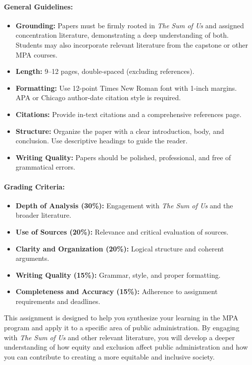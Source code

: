 \documentclass[12pt]{article}     %
\begin{document}
\paragraph*{General Guidelines:}
\begin{itemize}
    \item \textbf{Grounding:} Papers must be firmly rooted in \textit{The Sum of Us} and assigned concentration literature, demonstrating a deep understanding of both. Students may also incorporate relevant literature from the capstone or other MPA courses.  
    \item \textbf{Length:} 9--12 pages, double-spaced (excluding references).  
    \item \textbf{Formatting:} Use 12-point Times New Roman font with 1-inch margins. APA or Chicago author-date citation style is required.  
    \item \textbf{Citations:} Provide in-text citations and a comprehensive references page.  
    \item \textbf{Structure:} Organize the paper with a clear introduction, body, and conclusion. Use descriptive headings to guide the reader.  
    \item \textbf{Writing Quality:} Papers should be polished, professional, and free of grammatical errors.  
\end{itemize}

\paragraph*{Grading Criteria:}
\begin{itemize}
    \item \textbf{Depth of Analysis (30\%):} Engagement with \textit{The Sum of Us} and the broader literature.
    \item \textbf{Use of Sources (20\%):} Relevance and critical evaluation of sources.
    \item \textbf{Clarity and Organization (20\%):} Logical structure and coherent arguments.
    \item \textbf{Writing Quality (15\%):} Grammar, style, and proper formatting.
    \item \textbf{Completeness and Accuracy (15\%):} Adherence to assignment requirements and deadlines.
\end{itemize}
\noindent This assignment is designed to help you synthesize your learning in the MPA program and apply it to a specific area of public administration. By engaging with \textit{The Sum of Us} and other relevant literature, you will develop a deeper understanding of how equity and exclusion affect public administration and how you can contribute to creating a more equitable and inclusive society.
\end{document}
